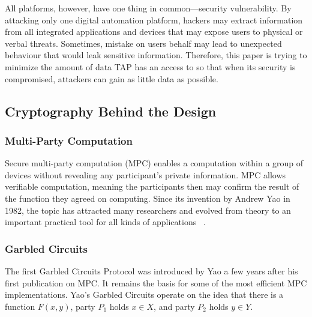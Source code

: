 All platforms, however, have one thing in common---security vulnerability. By attacking only one digital
automation platform, hackers may extract information from all integrated applications and devices that
may expose users to physical or verbal threats. Sometimes, mistake on users behalf may lead to
unexpected behaviour that would leak sensitive information. Therefore, this paper is trying to minimize
the amount of data TAP has an access to so that when its security is compromised, attackers can gain as
little data as possible.


\subsection{Cryptography Behind the Design}

\subsubsection{Multi-Party Computation}

Secure multi-party computation (MPC) enables a computation within a group of devices without revealing
any participant's private information. MPC allows verifiable computation, meaning the participants then
may confirm the result of the function they agreed on computing. Since its invention by Andrew Yao in
1982, the topic has attracted many researchers and evolved from theory to an important practical tool for
all kinds of applications ~\cite{DBLP:journals/ftsec/EvansKR18}.


\subsubsection{Garbled Circuits}

The first Garbled Circuits Protocol was introduced by Yao a few years after his first publication on MPC. It remains the basis for some of the most efficient MPC implementations. Yao's Garbled Circuits operate on the idea that there is a function $F(x,y)$, party $P_1$ holds $x \in X$, and party $P_2$ holds $y \in Y$.